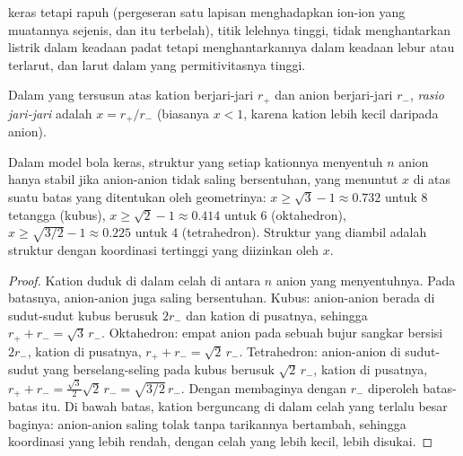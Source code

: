 \begin{proposition}\label{prop:b1:crystals-ionic-covalent:ionic-properties}
 keras tetapi rapuh (pergeseran satu lapisan menghadapkan
ion-ion yang muatannya sejenis, dan  itu terbelah), titik lelehnya
tinggi, tidak menghantarkan listrik dalam keadaan padat tetapi
menghantarkannya dalam keadaan lebur atau terlarut, dan larut dalam
 yang permitivitasnya tinggi.
\end{proposition}
\admitted

\begin{definition}\label{def:b1:crystals-ionic-covalent:radius-ratio}
Dalam  yang tersusun atas kation berjari-jari $r_+$ dan anion
berjari-jari $r_-$, \emph{rasio jari-jari} adalah
$x = r_+/r_-$ (biasanya $x < 1$, karena kation lebih kecil daripada
anion).
\end{definition}

\begin{proposition}\label{prop:b1:crystals-ionic-covalent:rule}
Dalam model bola keras, struktur yang setiap kationnya menyentuh $n$
anion hanya stabil jika anion-anion tidak saling bersentuhan, yang
menuntut $x$ di atas suatu batas yang ditentukan oleh geometrinya:
$x \ge \sqrt3 - 1
\approx 0.732$ untuk 8 tetangga (kubus), $x \ge \sqrt2 - 1 \approx 0.414$
untuk 6 (oktahedron), $x \ge \sqrt{3/2} - 1 \approx 0.225$ untuk 4
(tetrahedron). Struktur yang diambil adalah struktur dengan koordinasi
tertinggi yang diizinkan oleh $x$.
\end{proposition}

\begin{proof}
Kation duduk di dalam celah di antara $n$ anion yang menyentuhnya. Pada
batasnya, anion-anion juga saling bersentuhan. Kubus: anion-anion berada
di sudut-sudut kubus berusuk $2r_-$ dan kation di pusatnya, sehingga $r_+ +
r_- = \sqrt3\,r_-$. Oktahedron: empat anion pada sebuah bujur sangkar
bersisi $2r_-$, kation di pusatnya, $r_+ + r_- = \sqrt2\,r_-$.
Tetrahedron: anion-anion di sudut-sudut yang berselang-seling pada kubus
berusuk $\sqrt2\,r_-$, kation di pusatnya,
$r_+ + r_- = \frac{\sqrt3}{2}\sqrt2\,r_- = \sqrt{3/2}\,r_-$.
Dengan membaginya dengan $r_-$ diperoleh batas-batas itu. Di bawah batas,
kation berguncang di dalam celah yang terlalu besar baginya: anion-anion
saling tolak tanpa tarikannya bertambah, sehingga koordinasi yang lebih
rendah, dengan celah yang lebih kecil, lebih disukai.
\end{proof}

